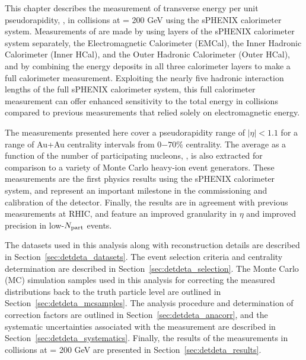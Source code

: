 This chapter describes the measurement of transverse energy per unit pseudorapidity, \detdeta, in \auau collisions at \snn = 200 GeV using the sPHENIX calorimeter system.
Measurements of \detdeta are made by using layers of the sPHENIX calorimeter system separately, the Electromagnetic Calorimeter (EMCal), the Inner Hadronic Calorimeter (Inner HCal), and the Outer Hadronic Calorimeter (Outer HCal),
and by combining the energy deposits in all three calorimeter layers to make a full calorimeter measurement. 
Exploiting the nearly five hadronic interaction lengths of the full sPHENIX calorimeter system, this full calorimeter measurement can offer enhanced sensitivity to the total energy in \auau collisions compared to previous measurements that relied solely on electromagnetic energy. 

The \detdeta measurements presented here cover a pseudorapidity range of $|\eta| < 1.1$ for a range of Au+Au centrality intervals from $0\mathrm{-}70\%$ centrality. 
The average \detdeta as a function of the number of participating nucleons, \Npart, is also extracted for comparison to a variety of Monte Carlo heavy-ion event generators.
These measurements are the first physics results using the sPHENIX calorimeter system, and represent an important milestone in the commissioning and calibration of the detector.
Finally, the \detdeta results are in agreement with previous measurements at RHIC, and feature an improved granularity in $\eta$ and improved precision in low-$\mbox{$N_{\mathrm{part}}$}$ events.

The datasets used in this analysis along with reconstruction details are described in Section~\ref{sec:detdeta_datasets}.
The event selection criteria and centrality determination are described in Section~\ref{sec:detdeta_selection}.
The Monte Carlo (MC) simulation samples used in this analysis for correcting the measured \detdeta distributions back to the truth particle level are outlined in Section~\ref{sec:detdeta_mcsamples}.
The analysis procedure and determination of \detdeta correction factors are outlined in Section~\ref{sec:detdeta_anacorr}, and the systematic uncertainties associated with the measurement are described in Section~\ref{sec:detdeta_systematics}.
Finally, the results of the \detdeta measurements in \auau collisions at \snn = 200 GeV are presented in Section~\ref{sec:detdeta_results}.



